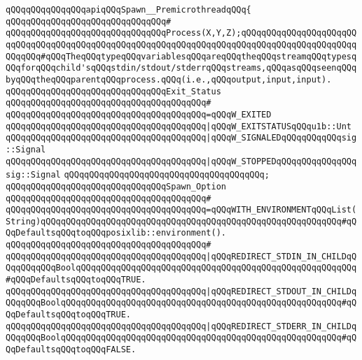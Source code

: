 \newline
\verb|qQQqqQQqqQQqqQQqapiqQQqSpawn__PremicrothreadqQQq{|\newline
\verb|qQQqqQQqqQQqqQQqqQQqqQQqqQQqqQQq#|\newline
\verb|qQQqqQQqqQQqqQQqqQQqqQQqqQQqqQQqProcess(X,Y,Z);qQQqqQQqqQQqqQQqqQQqqQQqqQQqqQQqqQQqqQQqqQQqqQQqqQQqqQQqqQQqqQQqqQQqqQQqqQQqqQQqqQQqqQQqqQQqqQQqqQQq#qQQqTheqQQqtypeqQQqvariablesqQQqareqQQqtheqQQqstreamqQQqtypesqQQqforqQQqchild'sqQQqstdin/stdout/stderrqQQqstreams,qQQqasqQQqseenqQQqbyqQQqtheqQQqparentqQQqprocess.qQQq(i.e.,qQQqoutput,input,input).|\newline
\newline
\verb|qQQqqQQqqQQqqQQqqQQqqQQqqQQqqQQqExit_Status|\newline
\verb|qQQqqQQqqQQqqQQqqQQqqQQqqQQqqQQqqQQqqQQq#|\newline
\verb|qQQqqQQqqQQqqQQqqQQqqQQqqQQqqQQqqQQqqQQq=qQQqW_EXITED|\newline
\verb|qQQqqQQqqQQqqQQqqQQqqQQqqQQqqQQqqQQqqQQq|\verb#|qQQqW_EXITSTATUSqQQqu1b::Unt#\newline
\verb|qQQqqQQqqQQqqQQqqQQqqQQqqQQqqQQqqQQqqQQq|\verb#|qQQqW_SIGNALEDqQQqqQQqqQQqsig::Signal#\newline
\verb|qQQqqQQqqQQqqQQqqQQqqQQqqQQqqQQqqQQqqQQq|\verb#|qQQqW_STOPPEDqQQqqQQqqQQqqQQqsig::Signal#\newline
\verb|qQQqqQQqqQQqqQQqqQQqqQQqqQQqqQQqqQQqqQQq;|\newline
\newline
\verb|qQQqqQQqqQQqqQQqqQQqqQQqqQQqqQQqSpawn_Option|\newline
\verb|qQQqqQQqqQQqqQQqqQQqqQQqqQQqqQQqqQQqqQQq#|\newline
\verb|qQQqqQQqqQQqqQQqqQQqqQQqqQQqqQQqqQQqqQQq=qQQqWITH_ENVIRONMENTqQQqList(String)qQQqqQQqqQQqqQQqqQQqqQQqqQQqqQQqqQQqqQQqqQQqqQQqqQQqqQQqqQQq#qQQqDefaultsqQQqtoqQQqposixlib::environment().|\newline
\verb|qQQqqQQqqQQqqQQqqQQqqQQqqQQqqQQqqQQqqQQq#|\newline
\verb|qQQqqQQqqQQqqQQqqQQqqQQqqQQqqQQqqQQqqQQq|\verb#|qQQqREDIRECT_STDIN_IN_CHILDqQQqqQQqqQQqBoolqQQqqQQqqQQqqQQqqQQqqQQqqQQqqQQqqQQqqQQqqQQqqQQqqQQqqQQq#\verb|#qQQqDefaultsqQQqtoqQQqTRUE.|\newline
\verb|qQQqqQQqqQQqqQQqqQQqqQQqqQQqqQQqqQQqqQQq|\verb#|qQQqREDIRECT_STDOUT_IN_CHILDqQQqqQQqBoolqQQqqQQqqQQqqQQqqQQqqQQqqQQqqQQqqQQqqQQqqQQqqQQqqQQqqQQq#\verb|#qQQqDefaultsqQQqtoqQQqTRUE.|\newline
\verb|qQQqqQQqqQQqqQQqqQQqqQQqqQQqqQQqqQQqqQQq|\verb#|qQQqREDIRECT_STDERR_IN_CHILDqQQqqQQqBoolqQQqqQQqqQQqqQQqqQQqqQQqqQQqqQQqqQQqqQQqqQQqqQQqqQQqqQQq#\verb|#qQQqDefaultsqQQqtoqQQqFALSE.|\newline
